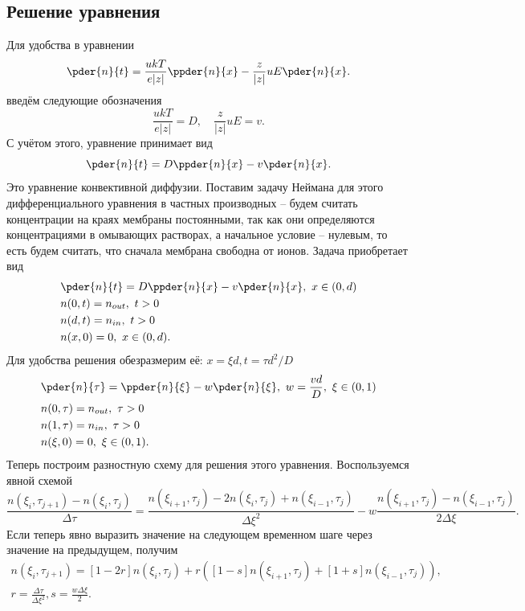 \subsection{Решение уравнения}
    Для удобства в уравнении
    \[
        \pder{n}{t} = \frac{ukT}{e|z|}\ppder{n}{x} -
            \frac{z}{|z|}uE\pder{n}{x}.
    \]
    введём следующие обозначения
    \[
        \frac{ukT}{e|z|} = D,\quad \frac{z}{|z|}uE = v.
    \]
    С учётом этого, уравнение принимает вид
    \[
        \pder{n}{t} = D\ppder{n}{x} - v\pder{n}{x}.
    \]
    Это уравнение конвективной диффузии. Поставим задачу Неймана для
    этого дифференциального уравнения в частных производных -- будем
    считать концентрации на краях мембраны постоянными, так как они
    определяются концентрациями в омывающих растворах, а начальное
    условие -- нулевым, то есть будем считать, что сначала мембрана
    свободна от ионов. Задача приобретает вид
    \begin{align*}
        & \pder{n}{t} = D\ppder{n}{x} - v\pder{n}{x},\ x\in(0,d)\\
        & n(0, t) = n_{out},\ t>0 \\
        & n(d, t) = n_{in},\ t>0 \\
        & n(x, 0) = 0,\ x\in(0,d).
    \end{align*}
    Для удобства решения обезразмерим её:
    \( x = \xi d, t = \tau d^2 / D \)
    \begin{align*}
        & \pder{n}{\tau} = \ppder{n}{\xi} -
            w\pder{n}{\xi},\ w = \frac{vd}{D},\ \xi\in(0,1) \\
        & n(0, \tau) = n_{out},\ \tau>0 \\
        & n(1, \tau) = n_{in},\ \tau>0 \\
        & n(\xi, 0) = 0,\ \xi\in(0,1).
    \end{align*}
    Теперь построим разностную схему для решения этого уравнения.
    Воспользуемся явной схемой
    \[
        \frac{n(\xi_i,\tau_{j+1}) - n(\xi_i, \tau_j)}{\Delta\tau} =
        \frac{n(\xi_{i+1},\tau_j) - 2n(\xi_i, \tau_j) +
        n(\xi_{i-1},\tau_j)}{\Delta\xi^2} -
        w\frac{n(\xi_{i+1},\tau_j) - n(\xi_{i-1}, \tau_j)}{2\Delta\xi}.
    \]
    Если теперь явно выразить значение на следующем временном шаге через
    значение на предыдущем, получим
    \begin{gather*}
        n(\xi_i,\tau_{j+1}) =
        [1-2r]n(\xi_i, \tau_j) +
        r\left(
            [1 - s]n(\xi_{i+1},\tau_j) + [1 + s]n(\xi_{i-1},\tau_j)
        \right),\\
        r = \frac{\Delta\tau}{\Delta\xi^2}, s = \frac{w\Delta\xi}{2}.
    \end{gather*}

